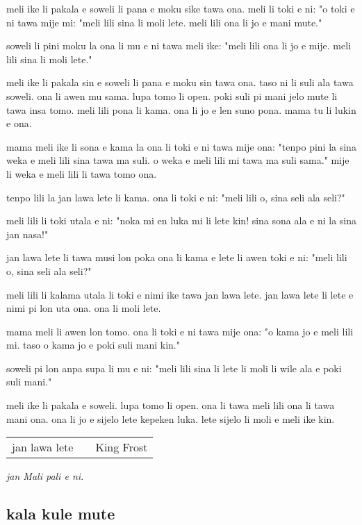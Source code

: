 meli ike li pakala e soweli li pana e moku sike tawa ona. 
meli li toki e ni: 
"o toki e ni tawa mije mi: 
"meli lili sina li moli lete. 
meli lili ona li jo e mani mute."

soweli li pini moku la ona li mu e ni tawa meli ike: 
"meli lili ona li jo e mije. 
meli lili sina li moli lete."

meli ike li pakala sin e soweli li pana e moku sin tawa ona. 
taso ni li suli ala tawa soweli. 
ona li awen mu sama. 
lupa tomo li open. 
poki suli pi mani jelo mute li tawa insa tomo. 
meli lili pona li kama. 
ona li jo e len suno pona. 
mama tu li lukin e ona.

mama meli ike li sona e kama la ona li toki e ni tawa mije ona: 
"tenpo pini la sina weka e meli lili sina tawa ma suli. 
o weka e meli lili mi tawa ma suli sama." 
mije li weka e meli lili li tawa tomo ona.

tenpo lili la jan lawa lete li kama. 
ona li toki e ni: 
"meli lili o, sina seli ala seli?"

meli lili li toki utala e ni: 
"noka mi en luka mi li lete kin! 
sina sona ala e ni la sina jan nasa!"

jan lawa lete li tawa musi lon poka ona li kama e lete li awen toki e ni: 
"meli lili o, sina seli ala seli?"

meli lili li kalama utala li toki e nimi ike tawa jan lawa lete. 
jan lawa lete li lete e nimi pi lon uta ona. 
ona li moli lete.

mama meli li awen lon tomo. 
ona li toki e ni tawa mije ona: 
"o kama jo e meli lili mi. 
taso o kama jo e poki suli mani kin."

soweli pi lon anpa supa li mu e ni: 
"meli lili sina li lete li moli li wile ala e poki suli mani."

meli ike li pakala e soweli. 
lupa tomo li open. 
ona li tawa meli lili ona li tawa mani ona. 
ona li jo e sijelo lete kepeken luka. 
lete sijelo li moli e meli ike kin.

\begin{supertabular}{p{5,5cm}|ll}
jan lawa lete  && King Frost  \\
\end{supertabular}

\textit{jan Mali pali e ni. \cite{www:astrodonunt:01}}
%
\subsection{kala kule mute}

